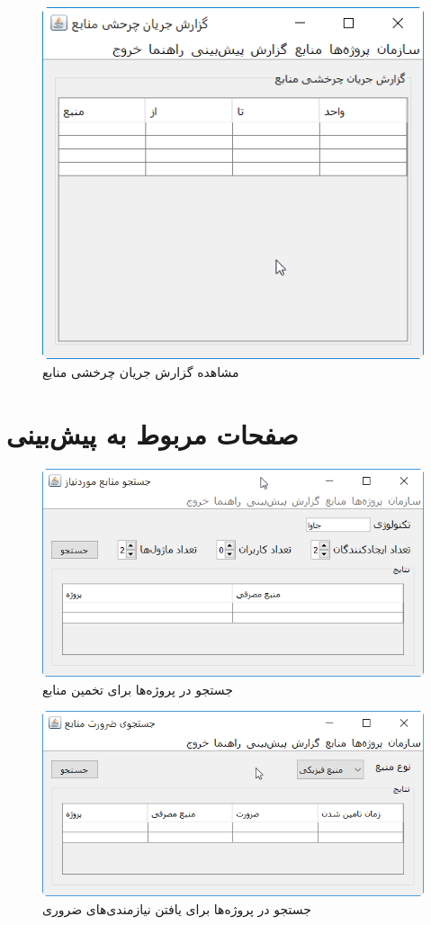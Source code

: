 \begin{figure}[H]
	\centering
	\includegraphics[scale=0.8]{img/prot/ViewFlowResourceReport}
	\caption{مشاهده گزارش جریان چرخشی منابع }
\end{figure}


\section{صفحات مربوط به پیش‌بینی}
\begin{figure}[H]
	\centering
	\includegraphics[scale=0.8]{img/prot/EstimateRequirements}
	\caption{جستجو در پروژه‌ها برای تخمین منابع }
\end{figure}
\begin{figure}[H]
	\centering
	\includegraphics[scale=0.8]{img/prot/EstimateResources}
	\caption{جستجو در پروژه‌ها برای یافتن نیازمندی‌های ضروری }
\end{figure}
